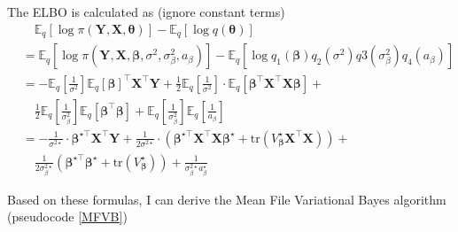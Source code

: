\documentclass[12pt]{article}
\begin{document}
The ELBO is calculated as (ignore constant terms)
\begin{align*}
	&\quad \mathbb{E}_q[\log \pi (\bm{Y}, \bm{X}, \bm{\theta})] - \mathbb{E}_q[\log q(\bm{\theta})]\\
	&=\mathbb{E}_q[\log \pi (\bm{Y}, \bm{X}, \bm{\beta}, \sigma^2, \sigma_{\beta}^2, a_{\beta})] - \mathbb{E}_q[\log q_1(\bm{\beta})q_2(\sigma^2)q3(\sigma_{\beta}^2)q_4(a_{\beta})]\\
	&=-\mathbb{E}_q\left[\frac{1}{\sigma^2} \right]\mathbb{E}_q[\bm{\beta}]^\top \bm{X}^\top \bm{Y} + \frac{1}{2}\mathbb{E}_q\left[\frac{1}{\sigma^2} \right]\cdot \mathbb{E}_q[\bm{\beta}^\top \bm{X}^\top \bm{X}\bm{\beta}]+\\
	&\quad \frac{1}{2} \mathbb{E}_q\left[\frac{1}{\sigma_\beta^2}\right]\mathbb{E}_q[\bm{\beta}^\top \bm{\beta}] + \mathbb{E}_q\left[\frac{1}{\sigma_\beta^2}\right] \mathbb{E}_q\left[\frac{1}{a_\beta}\right]\\
	&=-\frac{1}{\sigma^{2\star}}\cdot \bm{\beta}^{\star \top} \bm{X}^{\top} \bm{Y} + \frac{1}{2\sigma^{2\star}}\cdot \left( \bm{\beta}^{\star\top} \bm{X}^{\top}\bm{X} \bm{\beta}^{\star}  + \text{tr}(V_{\bm{\beta}}^\star\bm{X}^\top \bm{X})\right) +\\
	&\quad \frac{1}{2\sigma_{\beta}^{2\star}}\left(\bm{\beta}^{\star\top} \bm{\beta}^{\star} + \text{tr}(V_{\bm{\beta}}^\star) \right) + \frac{1}{\sigma_{\beta}^{2\star} a_{\beta}^\star}
\end{align*}


Based on these formulas, I can derive the Mean File Variational Bayes algorithm (pseudocode \ref{MFVB})
\end{document}
